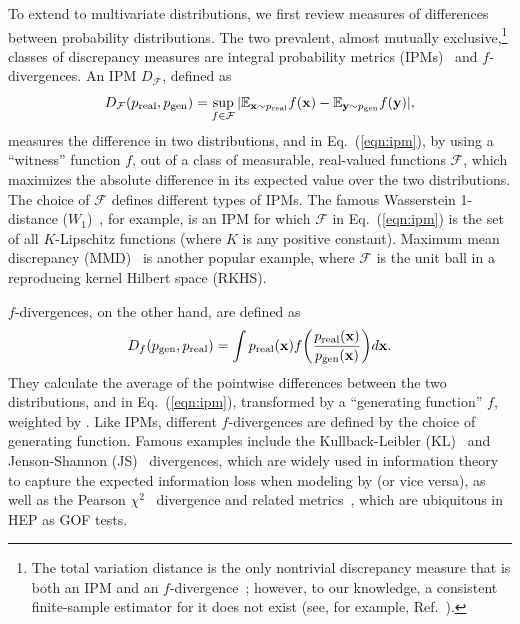 To extend to multivariate distributions, we first review measures of differences between probability distributions.
The two prevalent, almost mutually exclusive,\footnote{The total variation distance is the only nontrivial discrepancy measure that is both an IPM and an $f$-divergence~\cite[Appendix A]{sriperumbudur_empirical}; however, to our knowledge, a consistent finite-sample estimator for it does not exist (see, for example, Ref.~\cite[Section 5]{sriperumbudur_empirical}).} classes of discrepancy measures are integral probability metrics (IPMs)~\cite{muller_ipms} and $f$-divergences.
An IPM $D_{\mathcal{F}}$, defined as
\
\begin{equation}\label{eqn:ipm}
    D_{\mathcal{F}}(p_{\mathrm{real}}, p_{\mathrm{gen}}) = \sup _{f \in \mathcal F} |\mathbb E_{\mathbf{x} \sim p_{\mathrm{real}}} f(\mathbf{x}) - \mathbb E_{\mathbf{y} \sim p_{\mathrm{gen}}} f(\mathbf{y})|,
\end{equation}
measures the difference in two distributions,  and  in Eq.~(\ref{eqn:ipm}), by using a ``witness'' function $f$, out of a class of measurable, real-valued functions $\mathcal{F}$, which maximizes the absolute difference in its expected value over the two distributions.
The choice of $\mathcal{F}$ defines different types of IPMs.
The famous Wasserstein 1-distance ($W_1$)~\cite{wasserstein_original,villani_ot}, for example, is an IPM for which $\mathcal F$ in Eq.~(\ref{eqn:ipm}) is the set of all $K$-Lipschitz functions (where $K$ is any positive constant).
Maximum mean discrepancy (MMD)~\cite{gretton_mmd} is another popular example, where $\mathcal F$ is the unit ball in a reproducing kernel Hilbert space (RKHS).

$f$-divergences, on the other hand, are defined as
\begin{equation}\label{eqn:fdiv}
    D_f(p_{\mathrm{gen}}, p_{\mathrm{real}}) = \int p_{\mathrm{real}} (\mathbf{x}) f \bigg( \frac{p_{\mathrm{real}} (\mathbf{x})}{p_{\mathrm{gen}} (\mathbf{x})} \bigg ) d\mathbf{x}.
\end{equation}
They calculate the average of the pointwise differences between the two distributions,  and  in Eq.~(\ref{eqn:ipm}), transformed by a ``generating function'' $f$, weighted by .
Like IPMs, different $f$-divergences are defined by the choice of generating function.
Famous examples include the Kullback-Leibler (KL)~\cite{kl} and Jenson-Shannon (JS)~\cite{js_1,js_2} divergences, which are widely used in information theory to capture the expected information loss when modeling  by  (or vice versa), as well as the Pearson $\chi^2$~\cite{pearson} divergence and related metrics~\cite{Baker:1983tu,generalization_gof,parametric}, which are ubiquitous in HEP as GOF tests.

